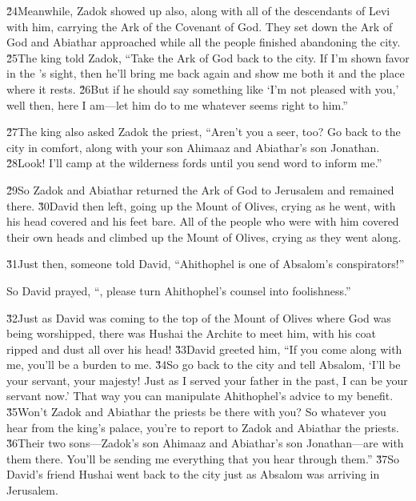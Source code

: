 \v{24}Meanwhile, Zadok showed up also, along with all of the descendants of Levi with him, carrying the Ark of the Covenant of God. They set down the Ark of God and Abiathar approached while all the people finished abandoning the city. \v{25}The king told Zadok, ``Take the Ark of God back to the city. If I'm shown favor in the 's sight, then he'll bring me back again and show me both it and the place where it rests. \v{26}But if he should say something like `I'm not pleased with you,' well then, here I am---let him do to me whatever seems right to him.''

\v{27}The king also asked Zadok the priest, ``Aren't you a seer, too? Go back to the city in comfort, along with your son Ahimaaz and Abiathar's son Jonathan. \v{28}Look! I'll camp at the wilderness fords until you send word to inform me.''

\v{29}So Zadok and Abiathar returned the Ark of God to Jerusalem and remained there. \v{30}David then left, going up the Mount of Olives, crying as he went, with his head covered and his feet bare. All of the people who were with him covered their own heads and climbed up the Mount of Olives, crying as they went along.

\v{31}Just then, someone told David, ``Ahithophel is one of Absalom's conspirators!''

So David prayed, ``, please turn Ahithophel's counsel into foolishness.''

\v{32}Just as David was coming to the top of the Mount of Olives where God was being worshipped, there was Hushai the Archite to meet him, with his coat ripped and dust all over his head! \v{33}David greeted him, ``If you come along with me, you'll be a burden to me. \v{34}So go back to the city and tell Absalom, `I'll be your servant, your majesty! Just as I served your father in the past, I can be your servant now.' That way you can manipulate Ahithophel's advice to my benefit. \v{35}Won't Zadok and Abiathar the priests be there with you? So whatever you hear from the king's palace, you're to report to Zadok and Abiathar the priests. \v{36}Their two sons---Zadok's son Ahimaaz and Abiathar's son Jonathan---are with them there. You'll be sending me everything that you hear through them.'' \v{37}So David's friend Hushai went back to the city just as Absalom was arriving in Jerusalem.

